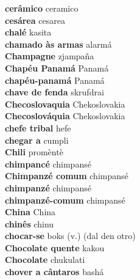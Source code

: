 \textbf{ cerâmico  } ceramico \\
\textbf{ cesárea  } cesarea \\
\textbf{ chalé  } kasita \\
\textbf{ chamado às armas  } alarmá \\
\textbf{ Champagne  } zjampaña \\
\textbf{ Chapéu Panamá  } Panamá \\
\textbf{ chapéu-panamá  } Panamá \\
\textbf{ chave de fenda  } skrufdrai \\
\textbf{ Checoslovaquia  } Chekoslovakia \\
\textbf{ Checoslováquia  } Chekoslovakia \\
\textbf{ chefe tribal  } hefe \\
\textbf{ chegar a  } cumpli \\
\textbf{ Chili  } promèntè \\
\textbf{ chimpancé  } chimpansé \\
\textbf{ Chimpanzé comum  } chimpansé \\
\textbf{ chimpanzé  } chimpansé \\
\textbf{ chimpanzé-comum  } chimpansé \\
\textbf{ China  } China \\
\textbf{ chinês  } chinu \\
\textbf{ chocar-se  } boks (v.) (dal den otro) \\
\textbf{ Chocolate quente  } kakou \\
\textbf{ Chocolate  } chukulati \\
\textbf{ chover a cântaros  } bashá \\
